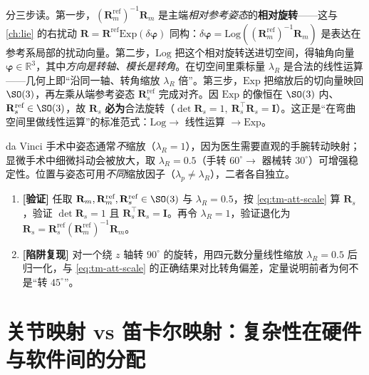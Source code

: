 \begin{derivation}
分三步读。第一步，$(\mathbf{R}_m^{\text{ref}})^{-1}\mathbf{R}_m$ 是主端\emph{相对参考姿态}的\textbf{相对旋转}——这与 \cref{ch:lie} 的右扰动 $\mathbf{R}=\mathbf{R}^{\text{ref}}\mathrm{Exp}(\delta\boldsymbol{\varphi})$ 同构：$\delta\boldsymbol{\varphi}=\mathrm{Log}((\mathbf{R}_m^{\text{ref}})^{-1}\mathbf{R}_m)$ 是表达在参考系局部的扰动向量。第二步，$\mathrm{Log}$ 把这个相对旋转送进切空间，得轴角向量 $\boldsymbol{\varphi}\in\mathbb{R}^3$，其中\emph{方向是转轴、模长是转角}。在切空间里乘标量 $\lambda_R$ 是合法的线性运算——几何上即“沿同一轴、转角缩放 $\lambda_R$ 倍”。第三步，$\mathrm{Exp}$ 把缩放后的切向量映回 $\SO(3)$，再左乘从端参考姿态 $\mathbf{R}_s^{\text{ref}}$ 完成对齐。因 $\mathrm{Exp}$ 的像恒在 $\SO(3)$ 内、$\mathbf{R}_s^{\text{ref}}\in\SO(3)$，故 $\mathbf{R}_s$ \textbf{必为}合法旋转（$\det\mathbf{R}_s=1,\ \mathbf{R}_s^\top\mathbf{R}_s=\mathbf{I}$）。这正是“在弯曲空间里做线性运算”的标准范式：$\mathrm{Log}\to$ 线性运算 $\to\mathrm{Exp}$。
\end{derivation}

\begin{note}[典型取值]
da Vinci 手术中姿态通常\emph{不}缩放（$\lambda_R=1$），因为医生需要直观的手腕转动映射；显微手术中细微抖动会被放大，取 $\lambda_R=0.5$（手转 $60^\circ\to$ 器械转 $30^\circ$）可增强稳定性。位置与姿态可用\emph{不同}缩放因子（$\lambda_p\neq\lambda_R$），二者各自独立。
\end{note}

\begin{practice}
\begin{enumerate}
  \item \textbf{[验证]} 任取 $\mathbf{R}_m,\mathbf{R}_m^{\text{ref}},\mathbf{R}_s^{\text{ref}}\in\SO(3)$ 与 $\lambda_R=0.5$，按 \cref{eq:tm-att-scale} 算 $\mathbf{R}_s$，验证 $\det\mathbf{R}_s=1$ 且 $\mathbf{R}_s^\top\mathbf{R}_s=\mathbf{I}$。再令 $\lambda_R=1$，验证退化为 $\mathbf{R}_s=\mathbf{R}_s^{\text{ref}}(\mathbf{R}_m^{\text{ref}})^{-1}\mathbf{R}_m$。
  \item \textbf{[陷阱复现]} 对一个绕 $z$ 轴转 $90^\circ$ 的旋转，用四元数分量线性缩放 $\lambda_R=0.5$ 后归一化，与 \cref{eq:tm-att-scale} 的正确结果对比转角偏差，定量说明前者为何不是“转 $45^\circ$”。
\end{enumerate}
\end{practice}

\section{关节映射 vs 笛卡尔映射：复杂性在硬件与软件间的分配}
\label{sec:tm-jointcart}

